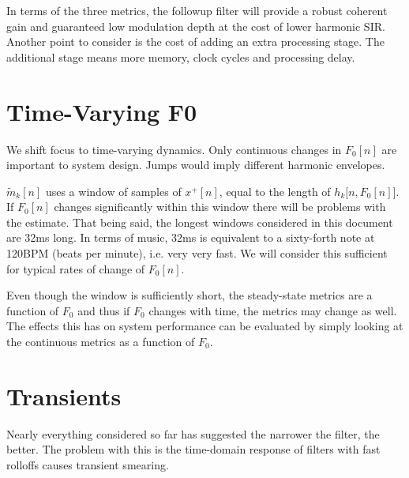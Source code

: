\documentclass [11pt, proquest,oneside] {ganter_thesis}[2015/03/03]
\begin{document}
In terms of the three metrics, the followup filter will provide a robust coherent gain and guaranteed low modulation depth at the cost of lower harmonic SIR.  Another point to consider is the cost of adding an extra processing stage.  The additional stage means more memory, clock cycles and processing delay.



\section{Time-Varying F0}

We shift focus to time-varying dynamics.  Only continuous changes in $F_0[n]$ are important to system design.  Jumps would imply different harmonic envelopes.

$\tilde{m}_k[n]$ uses a window of samples of $x^+[n]$, equal to the length of $h_k\big[n,F_0[n]\big]$.  If $F_0[n]$ changes significantly within this window there will be problems with the estimate.  That being said, the longest windows considered in this document are 32ms long.  In terms of music, 32ms is equivalent to a sixty-forth note at 120BPM (beats per minute), i.e. very very fast.  We will consider this sufficient for typical rates of change of $F_0[n]$.

Even though the window is sufficiently short, the steady-state metrics are a function of $F_0$ and thus if $F_0$ changes with time, the metrics may change as well.  The effects this has on system performance can be evaluated by simply looking at the continuous metrics as a function of $F_0$.

\section{Transients}\label{section:transients}
Nearly everything considered so far has suggested the narrower the filter, the better.  The problem with this is the time-domain response of filters with fast rolloffs causes transient smearing.
\end{document}
